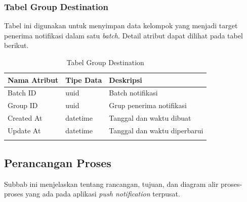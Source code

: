 \subsubsection{Tabel Group Destination}
\par Tabel ini digunakan untuk menyimpan data kelompok yang menjadi target penerima notifikasi dalam satu \textit{batch}. Detail atribut dapat dilihat pada tabel berikut.
\begin{longtable}{|p{2.5cm}|p{2cm}|p{4.5cm}|}
    \hline
    \textbf{Nama Atribut} & \textbf{Tipe Data} & \textbf{Deskripsi} \\ \hline
    Batch ID & uuid & Batch notifikasi \\ \hline
    Group ID & uuid & Grup penerima notifikasi \\ \hline
    Created At & datetime & Tanggal dan waktu dibuat \\ \hline
    Update At & datetime & Tanggal dan waktu diperbarui \\ \hline
    \caption{Tabel Group Destination}
\end{longtable}

\subsection{Perancangan Proses}
\par Subbab ini menjelaskan tentang rancangan, tujuan, dan diagram alir proses-proses yang ada pada aplikasi
\textit{push notification} terpusat.

